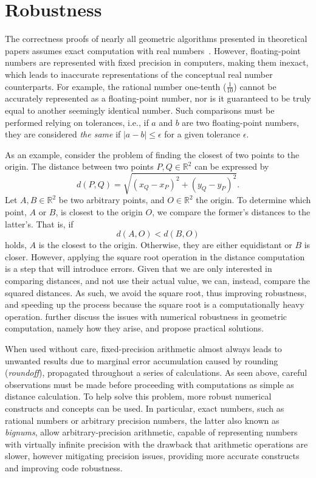 \section{Robustness}%
\label{sec:related.robustness}

The correctness proofs of nearly all geometric algorithms presented in
theoretical papers assumes exact computation with real
numbers~\cite{cgal:bfghhkps-lgk23-18b}.  However, floating-point numbers are
represented with fixed precision in computers, making them inexact, which leads
to inaccurate representations of the conceptual real number counterparts.  For
example, the rational number one-tenth ($\frac{1}{10}$) cannot be accurately
represented as a floating-point number, nor is it guaranteed to be truly equal
to another seemingly identical number.  Such comparisons must be performed
relying on tolerances, i.e., if $a$ and $b$ are two floating-point numbers, they
are considered \textit{the same} if $|a - b| \le \epsilon$ for a given tolerance
$\epsilon$.

As an example, consider the problem of finding the closest of two points
to the origin.  The distance between two points $P,Q \in \mathbb{R}^2$ can be
expressed by
%
\[ 
  d(P, Q) = \sqrt{(x_Q - x_P)^2 + (y_Q - y_P)^2}.
\]
%
Let $A,B \in \mathbb{R}^2$ be two arbitrary points, and $O \in \mathbb{R}^2$ the
origin.  To determine which point, $A$ or $B$, is closest to the origin $O$, we
compare the former's distances to the latter's.  That is, if
%
\[ 
  d(A, O) < d(B, O) 
\]
%
holds, $A$ is the closest to the origin.  Otherwise, they are either equidistant
or $B$ is closer.  However, applying the square root operation in the distance
computation is a step that will introduce errors.  Given that we are only
interested in comparing distances, and not use their actual value, we can,
instead, compare the squared distances.  As such, we avoid the square root, thus
improving robustness, and speeding up the process because the square root is a
computationally heavy operation.   further discuss the
issues with numerical robustness in geometric computation, namely how they
arise, and propose practical solutions.

When used without care, fixed-precision arithmetic almost always leads to
unwanted results due to marginal error accumulation caused by rounding
(\textit{roundoff}), propagated throughout a series of calculations.  As seen
above, careful observations must be made before proceeding with computations as
simple as distance calculation.  To help solve this problem, more robust
numerical constructs and concepts can be used.  In particular, exact numbers,
such as rational numbers or arbitrary precision numbers, the latter also known
as \textit{bignums}, allow arbitrary-precision arithmetic, capable of
representing numbers with virtually infinite precision with the drawback that
arithmetic operations are slower, however mitigating precision issues, providing
more accurate constructs and improving code robustness.

